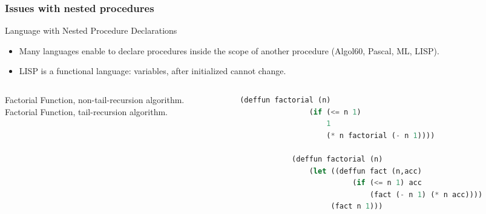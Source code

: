 \begin{bibunit}[apalike]
\subsubsection{Issues with nested procedures}

\tableofcontentslide[sections={1-4},sectionstyle={show/shaded},subsectionstyle={show/shaded/hide},subsubsectionstyle={show/shaded/hide/hide}]

\begin{frame}[fragile]{Language with Nested Procedure Declarations}
	\begin{itemize}
	\item Many languages enable to declare procedures inside the scope of another procedure (Algol60, Pascal, ML, LISP).
	\item LISP is a functional language: variables, after initialized cannot change.
	\end{itemize}
	\vfill
	\begin{columns}
		\begin{column}{.4\linewidth}
			Factorial Function, non-tail-recursion algorithm. \\
			\vspace{3em}
			Factorial Function, tail-recursion algorithm.
		\end{column}
		\begin{column}{.6\linewidth}
			\begin{lstlisting}[language=lisp,basicstyle=\footnotesize]
			(deffun factorial (n)
				(if (<= n 1)
				    1
				    (* n factorial (- n 1))))

			(deffun factorial (n)
				(let ((deffun fact (n,acc)
					      (if (<= n 1) acc
					          (fact (- n 1) (* n acc))))
				     (fact n 1)))
			\end{lstlisting}
		\end{column}
	\end{columns}
\end{frame}


\end{bibunit}
